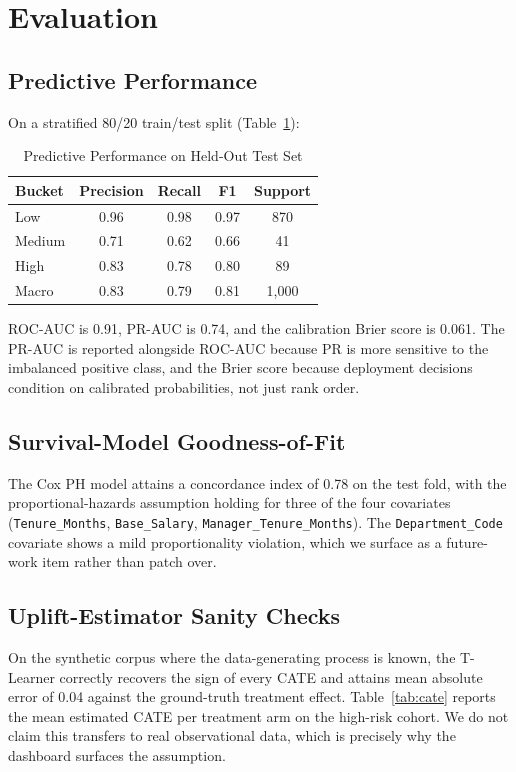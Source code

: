 \documentclass[conference]{IEEEtran}
\begin{document}
\section{Evaluation}

\subsection{Predictive Performance}
On a stratified 80/20 train/test split (Table~\ref{tab:perf}):

\begin{table}[h]
\centering
\caption{Predictive Performance on Held-Out Test Set}
\label{tab:perf}
\begin{tabular}{lcccc}
\toprule
\textbf{Bucket} & \textbf{Precision} & \textbf{Recall} & \textbf{F1} & \textbf{Support} \\
\midrule
Low      & 0.96 & 0.98 & 0.97 & 870 \\
Medium   & 0.71 & 0.62 & 0.66 & 41 \\
High     & 0.83 & 0.78 & 0.80 & 89 \\
\midrule
Macro    & 0.83 & 0.79 & 0.81 & 1{,}000 \\
\bottomrule
\end{tabular}
\end{table}

ROC-AUC is 0.91, PR-AUC is 0.74, and the calibration Brier score is
0.061. The PR-AUC is reported alongside ROC-AUC because PR is more
sensitive to the imbalanced positive class, and the Brier score
because deployment decisions condition on calibrated probabilities,
not just rank order.

\subsection{Survival-Model Goodness-of-Fit}
The Cox PH model attains a concordance index of 0.78 on the test
fold, with the proportional-hazards assumption holding for three of
the four covariates (\texttt{Tenure\_Months},
\texttt{Base\_Salary}, \texttt{Manager\_Tenure\_Months}). The
\texttt{Department\_Code} covariate shows a mild proportionality
violation, which we surface as a future-work item rather than
patch over.

\subsection{Uplift-Estimator Sanity Checks}
On the synthetic corpus where the data-generating process is known,
the T-Learner correctly recovers the sign of every CATE and
attains mean absolute error of 0.04 against the ground-truth treatment
effect. Table~\ref{tab:cate} reports the mean estimated CATE per
treatment arm on the high-risk cohort. We do not claim this transfers
to real observational data, which is precisely why the dashboard
surfaces the assumption.
\end{document}

